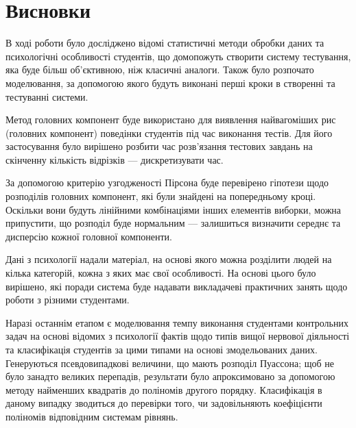 \chapter*{Висновки}

В ході роботи було досліджено відомі статистичні методи обробки даних
та психологічні особливості студентів, що домопожуть створити систему
тестування, яка буде більш об’єктивною, ніж класичні аналоги.
Також було розпочато моделювання, за допомогою якого будуть виконані
перші кроки в створенні та тестуванні системи.

Метод головних компонент буде використано для виявлення найвагоміших
рис (головних компонент) поведінки студентів під час виконання тестів.
Для його застосування було вирішено розбити час розв’язання тестових завдань
на скінченну кількість відрізків --- дискретизувати час.

За допомогою критерію узгодженості Пірсона буде перевірено гіпотези щодо
розподілів головних компонент, які були знайдені на попередньому кроці.
Оскільки вони будуть лінійними комбінаціями інших елементів виборки, можна
припустити, що розподіл буде нормальним --- залишиться визначити середнє
та дисперсію кожної головної компоненти.

Дані з психології надали матеріал, на основі якого можна розділити людей
на кілька категорій, кожна з яких має свої особливості.
На основі цього було вирішено, які поради система буде надавати викладачеві
практичних занять щодо роботи з різними студентами.

Наразі останнім етапом є моделювання темпу виконання студентами контрольних
задач на основі відомих з психології фактів щодо типів вищої нервової
діяльності та класифікація студентів за цими типами на основі змодельованих
даних.
Генеруються псевдовипадкові величини, що мають розподіл Пуассона;
щоб не було занадто великих перепадів, результати було апроксимовано за
допомогою методу найменших квадратів до поліномів другого порядку.
Класифікація в даному випадку зводиться до перевірки того, чи задовільняють
коефіцієнти поліномів відповідним системам рівнянь.
